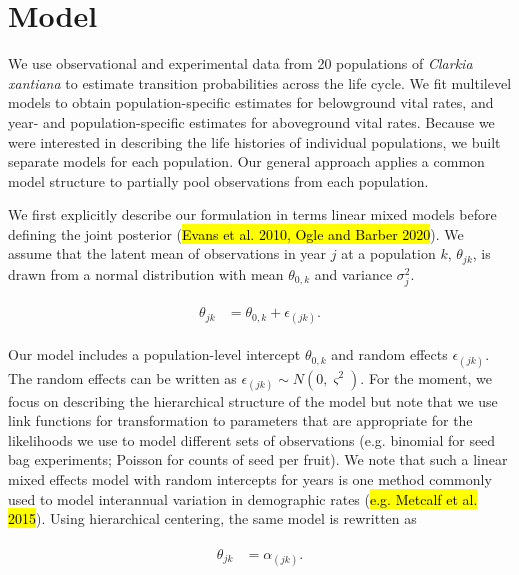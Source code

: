 \documentclass[12pt, oneside, titlepage]{article}   	%
\begin{document}
\tableofcontents

\clearpage
\section{Model}

We use observational and experimental data from 20 populations of \textit{Clarkia xantiana} to estimate transition probabilities across the life cycle. We fit multilevel models to obtain population-specific estimates for belowground vital rates, and year- and population-specific estimates for aboveground vital rates. Because we were interested in describing the life histories of individual populations, we built separate models for each population. Our general approach applies a common model structure to partially pool observations from each population. 

We first explicitly describe our formulation in terms linear mixed models before defining the joint posterior (\hl{Evans et al. 2010, Ogle and Barber 2020}). We assume that the latent mean of observations in year $j$ at a population $k$, $\theta_{jk}$, is drawn from a normal distribution with mean $\theta_{0,k}$ and variance $\sigma^2_j$.

\begin{align}
  \begin{split}
  \theta_{jk} &  = \theta_{0,k} +\epsilon_{(jk)}.
  \end{split}
\end{align}

Our model includes a population-level intercept $\theta_{0,k}$ and random effects $\epsilon_{(jk)}$. The random effects can be written as  $\epsilon_{(jk)}\sim N(0, \varsigma^2)$. For the moment, we focus on describing the hierarchical structure of the model but note that we use link functions for transformation to parameters that are appropriate for the likelihoods we use to model different sets of observations (e.g. binomial for seed bag experiments; Poisson for counts of seed per fruit). We note that such a linear mixed effects model with random intercepts for years is one method commonly used to model interannual variation in demographic rates (\hl{e.g. Metcalf et al. 2015}). Using hierarchical centering, the same model is rewritten as 

\begin{align}
  \begin{split}
  \theta_{jk} &  = \alpha_{(jk)}.
  \end{split}
\end{align}
\end{document}
